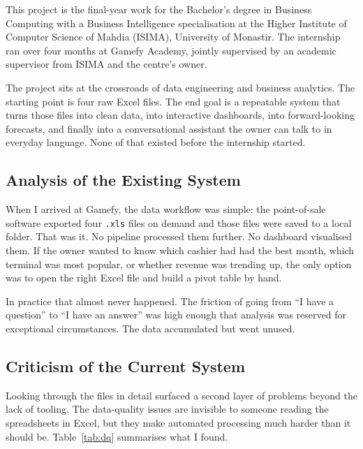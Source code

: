 \documentclass[12pt, a4paper]{report}
\begin{document}
This project is the final-year work for the Bachelor's degree in Business
Computing with a Business Intelligence specialisation at the Higher Institute
of Computer Science of Mahdia (ISIMA), University of Monastir. The internship
ran over four months at Gamefy Academy, jointly supervised by an academic
supervisor from ISIMA and the centre's owner.

The project sits at the crossroads of data engineering and business analytics.
The starting point is four raw Excel files. The end goal is a repeatable system
that turns those files into clean data, into interactive dashboards, into
forward-looking forecasts, and finally into a conversational assistant the
owner can talk to in everyday language. None of that existed before the
internship started.

\subsection{Analysis of the Existing System}

When I arrived at Gamefy, the data workflow was simple: the point-of-sale
software exported four \texttt{.xls} files on demand and those files were saved
to a local folder. That was it. No pipeline processed them further. No dashboard
visualised them. If the owner wanted to know which cashier had had the best
month, which terminal was most popular, or whether revenue was trending up, the
only option was to open the right Excel file and build a pivot table by hand.

In practice that almost never happened. The friction of going from
``I have a question'' to ``I have an answer'' was high enough that analysis was
reserved for exceptional circumstances. The data accumulated but went unused.

\subsection{Criticism of the Current System}

Looking through the files in detail surfaced a second layer of problems beyond
the lack of tooling. The data-quality issues are invisible to someone reading
the spreadsheets in Excel, but they make automated processing much harder than
it should be. Table~\ref{tab:dq} summarises what I found.
\end{document}
